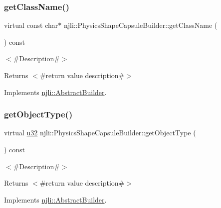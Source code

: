 \subsubsection{\texorpdfstring{get\+Class\+Name()}{getClassName()}}
{\footnotesize\ttfamily virtual const char$\ast$ njli\+::\+Physics\+Shape\+Capsule\+Builder\+::get\+Class\+Name (\begin{DoxyParamCaption}{ }\end{DoxyParamCaption}) const\hspace{0.3cm}{\ttfamily [virtual]}}

$<$\#\+Description\#$>$

\begin{DoxyReturn}{Returns}
$<$\#return value description\#$>$ 
\end{DoxyReturn}


Implements \mbox{\hyperlink{classnjli_1_1_abstract_builder_a902f73ea78031b06aca183a417f3413b}{njli\+::\+Abstract\+Builder}}.

\mbox{\label{classnjli_1_1_physics_shape_capsule_builder_a449979329f6b4b4093396ab819076c72}} 
\subsubsection{\texorpdfstring{get\+Object\+Type()}{getObjectType()}}
{\footnotesize\ttfamily virtual \mbox{\hyperlink{_util_8h_a10e94b422ef0c20dcdec20d31a1f5049}{u32}} njli\+::\+Physics\+Shape\+Capsule\+Builder\+::get\+Object\+Type (\begin{DoxyParamCaption}{ }\end{DoxyParamCaption}) const\hspace{0.3cm}{\ttfamily [virtual]}}

$<$\#\+Description\#$>$

\begin{DoxyReturn}{Returns}
$<$\#return value description\#$>$ 
\end{DoxyReturn}


Implements \mbox{\hyperlink{classnjli_1_1_abstract_builder_a0f2d344fcf697b167f4f2b1122b5fb33}{njli\+::\+Abstract\+Builder}}.

\mbox{\label{classnjli_1_1_physics_shape_capsule_builder_a7fd6bd989de9f3b930b7af5816dddb3b}} 
